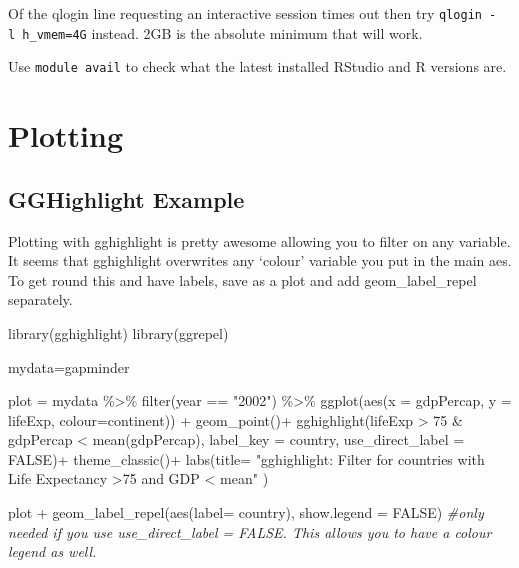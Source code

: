 \documentclass[
]{book}
\newenvironment{Shaded}{\begin{snugshade}}{\end{snugshade}}
\newcommand{\AttributeTok}[1]{\textcolor[rgb]{0.77,0.63,0.00}{#1}}
\newcommand{\CommentTok}[1]{\textcolor[rgb]{0.56,0.35,0.01}{\textit{#1}}}
\newcommand{\ConstantTok}[1]{\textcolor[rgb]{0.00,0.00,0.00}{#1}}
\newcommand{\DecValTok}[1]{\textcolor[rgb]{0.00,0.00,0.81}{#1}}
\newcommand{\FunctionTok}[1]{\textcolor[rgb]{0.00,0.00,0.00}{#1}}
\newcommand{\NormalTok}[1]{#1}
\newcommand{\OtherTok}[1]{\textcolor[rgb]{0.56,0.35,0.01}{#1}}
\newcommand{\SpecialCharTok}[1]{\textcolor[rgb]{0.00,0.00,0.00}{#1}}
\newcommand{\StringTok}[1]{\textcolor[rgb]{0.31,0.60,0.02}{#1}}
\begin{document}
Of the qlogin line requesting an interactive session times out then try \texttt{qlogin\ -l\ h\_vmem=4G} instead. 2GB is the absolute minimum that will work.

Use \texttt{module\ avail} to check what the latest installed RStudio and R versions are.

\hypertarget{plotting}{%
\chapter{Plotting}\label{plotting}}

\hypertarget{gghighlight-example}{%
\section{GGHighlight Example}\label{gghighlight-example}}

Plotting with gghighlight is pretty awesome allowing you to filter on any variable. It seems that gghighlight overwrites any `colour' variable you put in the main aes. To get round this and have labels, save as a plot and add geom\_label\_repel separately.

\begin{Shaded}
\begin{Highlighting}[]
\FunctionTok{library}\NormalTok{(gghighlight)}
\FunctionTok{library}\NormalTok{(ggrepel)}

\NormalTok{mydata}\OtherTok{=}\NormalTok{gapminder}

\NormalTok{plot }\OtherTok{=}\NormalTok{ mydata }\SpecialCharTok{\%\textgreater{}\%} 
  \FunctionTok{filter}\NormalTok{(year }\SpecialCharTok{==} \StringTok{"2002"}\NormalTok{) }\SpecialCharTok{\%\textgreater{}\%} 
  \FunctionTok{ggplot}\NormalTok{(}\FunctionTok{aes}\NormalTok{(}\AttributeTok{x =}\NormalTok{ gdpPercap, }\AttributeTok{y =}\NormalTok{ lifeExp, }\AttributeTok{colour=}\NormalTok{continent)) }\SpecialCharTok{+}
  \FunctionTok{geom\_point}\NormalTok{()}\SpecialCharTok{+}
  \FunctionTok{gghighlight}\NormalTok{(lifeExp }\SpecialCharTok{\textgreater{}} \DecValTok{75} \SpecialCharTok{\&}\NormalTok{ gdpPercap }\SpecialCharTok{\textless{}} \FunctionTok{mean}\NormalTok{(gdpPercap), }\AttributeTok{label\_key =}\NormalTok{ country, }\AttributeTok{use\_direct\_label =} \ConstantTok{FALSE}\NormalTok{)}\SpecialCharTok{+} 
  \FunctionTok{theme\_classic}\NormalTok{()}\SpecialCharTok{+} 
  \FunctionTok{labs}\NormalTok{(}\AttributeTok{title=} \StringTok{"gghighlight: Filter for countries with Life Expectancy \textgreater{}75 and GDP \textless{} mean"}\NormalTok{ )  }

\NormalTok{plot }\SpecialCharTok{+} \FunctionTok{geom\_label\_repel}\NormalTok{(}\FunctionTok{aes}\NormalTok{(}\AttributeTok{label=}\NormalTok{ country), }\AttributeTok{show.legend =} \ConstantTok{FALSE}\NormalTok{) }\CommentTok{\#only needed if you use  use\_direct\_label = FALSE. This allows you to have a colour legend as well. }
\end{Highlighting}
\end{Shaded}
\end{document}
